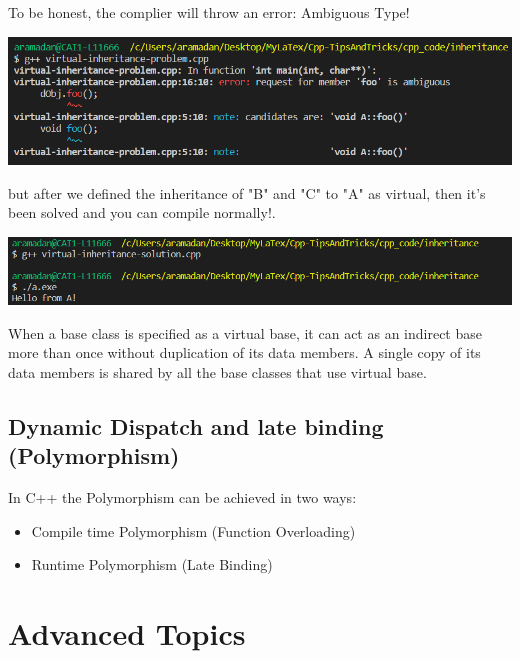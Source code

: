 \documentclass{article}
\begin{document}
To be honest, the complier will throw an error: Ambiguous Type!


\begin{center}
  \includegraphics[scale=0.75]{./imgs/vinheritance-problem.PNG}
\end{center}

but after we defined the inheritance of "B" and "C" to "A" as virtual, then it's been solved and you can compile normally!.



\begin{center}
  \includegraphics[scale=0.75]{./imgs/vinheritance-solution.PNG}
\end{center}

When a base class is specified as a virtual base, it can act as an indirect base more than once without duplication of its data members. A single copy of its data members is shared by all the base classes that use virtual base.

\subsection{Dynamic Dispatch and late binding (Polymorphism)}
In C++ the Polymorphism can be achieved in two ways: 
\begin{itemize}
  \item Compile time Polymorphism (Function Overloading)
  \item Runtime Polymorphism (Late Binding)
\end{itemize}

\section{Advanced Topics}
\end{document}
